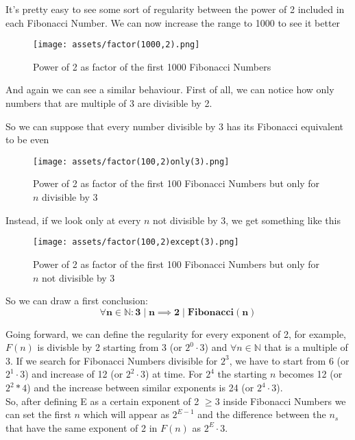 \documentclass[amsmath,amssymb,aps,pra,reprint,groupedaddress,showpacs]{revtex4-1}
\begin{document}
It's pretty easy to see some sort of regularity between the power of 2 included in each Fibonacci Number. We can now increase the range to 1000 to see it better

\begin{figure}[H]
\centering
\texttt{[image: assets/factor(1000,2).png]} %
\caption{Power of 2 as factor of the first 1000 Fibonacci Numbers}
\end{figure}

And again we can see a similar behaviour. First of all, we can notice how only numbers that are multiple of 3 are divisible by 2. 
  
So we can suppose that every number divisible by 3 has its Fibonacci equivalent to be even

\begin{figure}[H]
\centering
\texttt{[image: assets/factor(100,2)only(3).png]} %
\caption{Power of 2 as factor of the first 100 Fibonacci Numbers but only for $n$ divisible by 3}
\end{figure}

Instead, if we look only at every $n$ not divisible by 3, we get something like this

\begin{figure}[H]
\centering
\texttt{[image: assets/factor(100,2)except(3).png]} %
\caption{Power of 2 as factor of the first 100 Fibonacci Numbers but only for $n$ not divisible by 3}
\end{figure}

So we can draw a first conclusion: 
$$\mathbf{\forall n \in \mathbb{N} : 3\mid n \implies 2\mid Fibonacci(n)}$$

Going forward, we can define the regularity for every exponent of 2, 
for example, $F(n)$ is divisble by 2 starting from 3 (or $2^0 \cdot 3$) and $\forall n \in \mathbb{N}$ that is a multiple of 3.
If we search for Fibonacci Numbers divisible for $2^3$, we have to start from 6 (or $2^1 \cdot 3$)
and increase of 12 (or $2^2 \cdot 3$) at time. For $2^4$ the starting $n$ becomes 12 (or $2^2 * 4$)
and the increase between similar exponents is 24 (or $2^4 \cdot 3$).\\

So, after defining E as a certain exponent of 2 $\geq 3$ inside Fibonacci Numbers we can set the first $n$ which will appear as $2^{E-1}$ and the difference between the $n_s$ that have the same exponent of 2 in $F(n)$
as $2^E \cdot 3$.\\
\end{document}
